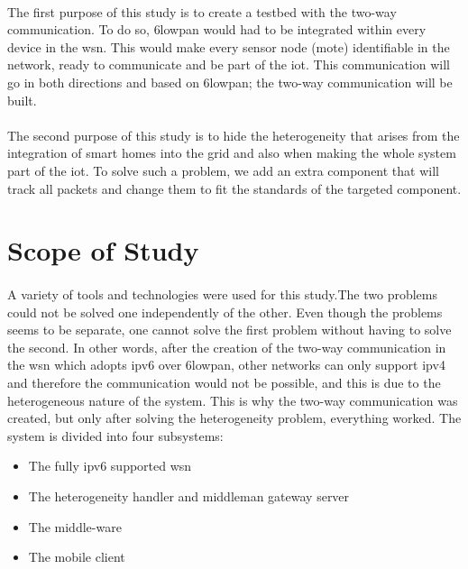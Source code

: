 \documentclass[12pt,a4paper,final]{report}
\begin{document}
\paragraph{}
The first purpose of this study is to create a testbed with the two-way communication. To do so, \gls{6lowpan} would had to be integrated within every device in the \gls{wsn}. This would make every sensor node (mote) identifiable in the network, ready to communicate and be part of the \gls{iot}. This communication will go in both directions and based on \gls{6lowpan}; the two-way communication will be built.
\paragraph{}
The second purpose of this study is to hide the heterogeneity that arises from the integration of smart homes into the grid and also when making the whole system part of the \gls{iot}. To solve such a problem, we add an extra component that will track all  packets and change them to fit the standards of the targeted component.

\section{Scope of Study}
\paragraph{}
A variety of tools and technologies were used for this study.The two problems could not be solved one independently of the other. Even though the problems seems to be separate, one cannot solve  the first problem without having to solve the second. In other words, after the creation of the two-way communication in the \gls{wsn} which adopts \gls{ipv6} over \gls{6lowpan}, other networks can only support \gls{ipv4} and therefore the communication would not be possible, and this is due to the heterogeneous nature of the system. This is why the two-way communication was created, but only after solving the heterogeneity problem, everything worked.
The system is divided into four subsystems:
\begin{itemize}
\item The fully \gls{ipv6} supported \gls{wsn}
\item The heterogeneity handler and middleman gateway server
\item The middle-ware
\item The mobile client
\end{itemize}
\end{document}
